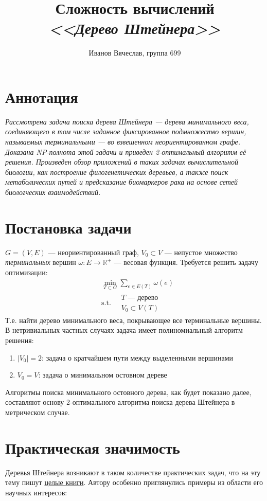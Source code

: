 \documentclass[11pt,a4paper]{report}
\title{Сложность вычислений\\\textit{<<Дерево Штейнера>>}}
\author{Иванов Вячеслав, группа 699}
\def\Real{\mathbb{R}}
\theoremstyle{definition}
\theoremstyle{definition}
\theoremstyle{definition}
\begin{document}
	\setlength{\parindent}{1cm}
	{\let\newpage\relax\maketitle}
	\tableofcontents
	\newpage 
	\section{Аннотация}
\textit{	Рассмотрена задача поиска дерева Штейнера — дерева минимального веса, соединяющего в том числе заданное фиксированное подмножество вершин, называемых терминальными — во взвешенном неориентированном графе. Доказана NP-полнота этой задачи и приведен 2-оптимальный алгоритм её решения. Произведен обзор приложений в таких задачах вычислительной биологии, как построение филогенетических деревьев, а также поиск метаболических путей и предсказание биомаркеров рака на основе сетей биологческих взаимодействий. }
	\section{Постановка задачи}
		 $G = (V, E)$ — неориентированный граф, $V_0 \subset V$ — непустое множество \textit{терминальных} вершин $\omega : E \to \Real^{+}$ — весовая функция. Требуется решить задачу оптимизации:
		\begin{align*}
			&\min_{T \subset G} \sum_{e \in E(T)} \omega(e)\\
			&\text{s.t.}\ 
			\begin{aligned}
				&T \text{ — дерево}\\
				&V_0 \subset V(T)			
			\end{aligned}
		\end{align*}
		Т.е. найти дерево минимального веса, покрывающее все терминальные вершины.\\
		В нетривиальных частных случаях задача имеет полиномиальный алгоритм решения:
		\begin{enumerate}
			\item $|V_0| = 2$: задача о кратчайшем пути между выделенными вершинами
			\item $V_0 = V$: задача о минимальном остовном дереве
		\end{enumerate}
		Алгоритмы поиска минимального остовного дерева, как будет показано далее, составляют основу 2-оптимального алгоритма поиска дерева Штейнера в метрическом случае.
	\section{Практическая значимость}
		Деревья Штейнера возникают в таком количестве практических задач, что на эту тему пишут \href{https://www.springer.com/gp/book/9781402000997}{целые книги}. Автору особенно приглянулись примеры из области его научных интересов:
\end{document}
